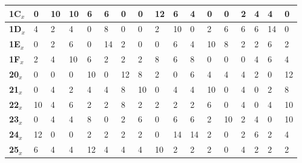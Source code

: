 \begin{longtable}[c]{|l|l|l|l|l|l|l|l|l|l|l|l|l|l|l|l|l|}
\textbf{1C}$_x$ & 0          & 10         & 10         & 6          & 6          & 0          & 0          & 12         & 6          & 4          & 0          & 0          & 2          & 4          & 4          & 0          \\ \hline
\textbf{1D}$_x$ & 4          & 2          & 4          & 0          & 8          & 0          & 0          & 2          & 10         & 0          & 2          & 6          & 6          & 6          & 14         & 0          \\ \hline
\textbf{1E}$_x$ & 0          & 2          & 6          & 0          & 14         & 2          & 0          & 0          & 6          & 4          & 10         & 8          & 2          & 2          & 6          & 2          \\ \hline
\textbf{1F}$_x$ & 2          & 4          & 10         & 6          & 2          & 2          & 2          & 8          & 6          & 8          & 0          & 0          & 0          & 4          & 6          & 4          \\ \hline
\textbf{20}$_x$ & 0          & 0          & 0          & 10         & 0          & 12         & 8          & 2          & 0          & 6          & 4          & 4          & 4          & 2          & 0          & 12         \\ \hline
\textbf{21}$_x$ & 0          & 4          & 2          & 4          & 4          & 8          & 10         & 0          & 4          & 4          & 10         & 0          & 4          & 0          & 2          & 8          \\ \hline
\textbf{22}$_x$ & 10         & 4          & 6          & 2          & 2          & 8          & 2          & 2          & 2          & 2          & 6          & 0          & 4          & 0          & 4          & 10         \\ \hline
\textbf{23}$_x$ & 0          & 4          & 4          & 8          & 0          & 2          & 6          & 0          & 6          & 6          & 2          & 10         & 2          & 4          & 0          & 10         \\ \hline
\textbf{24}$_x$ & 12         & 0          & 0          & 2          & 2          & 2          & 2          & 0          & 14         & 14         & 2          & 0          & 2          & 6          & 2          & 4          \\ \hline
\textbf{25}$_x$ & 6          & 4          & 4          & 12         & 4          & 4          & 4          & 10         & 2          & 2          & 2          & 0          & 4          & 2          & 2          & 2          \\ \hline

\end{longtable}
